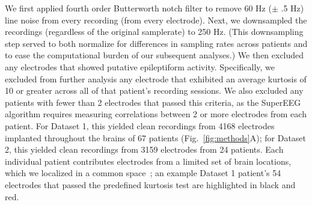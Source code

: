 \message{ !name(main.tex)}\documentclass[11pt]{article}
\begin{document}
We first applied fourth order Butterworth notch filter to remove 60 Hz
($\pm$ .5 Hz) line noise from every recording (from every electrode).
Next, we downsampled the recordings (regardless of the original
samplerate) to 250 Hz.  (This downsampling step served to both
normalize for differences in sampling rates across patients and to
ease the computational burden of our subsequent analyses.)  We then
excluded any electrodes that showed putative epileptiform activity.
Specifically, we excluded from further analysis any electrode that
exhibited an average kurtosis of 10 or greater across all of that
patient's recording sessions.  We also excluded any patients with
fewer than 2 electrodes that passed this criteria, as the SuperEEG
algorithm requires measuring correlations between 2 or more electrodes
from each patient.  For Dataset 1, this yielded clean recordings from
4168 electrodes implanted throughout the brains of 67 patients
(Fig.~\ref{fig:methods}A); for Dataset 2, this yielded clean
recordings from 3159 electrodes from 24 patients.  Each individual
patient contributes electrodes from a limited set of brain locations,
which we localized in a common space~\citep[MNI152;][]{GrabEtal06}; an
example Dataset 1 patient's 54 electrodes that passed the predefined
kurtosis test are highlighted in black and red.
\end{document}
